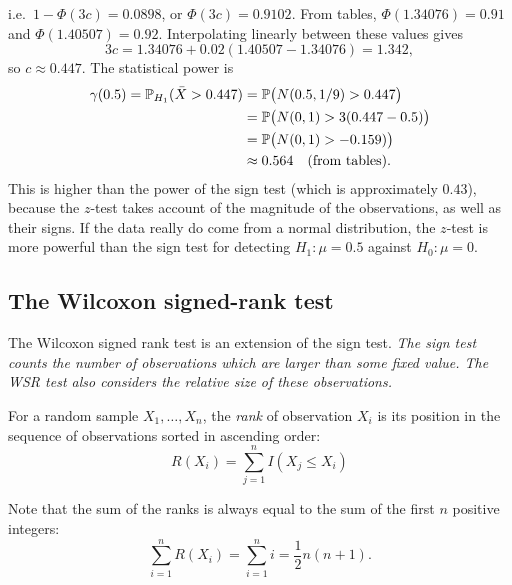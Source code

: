 \begin{exercise}
\begin{questions}
\begin{answer}
\[\]
i.e.\ $1-\Phi(3c) = 0.0898$, or $\Phi(3c) = 0.9102$. From tables, $\Phi(1.34076) = 0.91$ and $\Phi(1.40507)= 0.92$. Interpolating linearly between these values gives
\[
3c = 1.34076 + 0.02(1.40507 - 1.34076) = 1.342,
\]
so $c\approx 0.447$. The statistical power is 
\begin{align*}
\gamma(0.5) = \mathbb{P}_{H_1}(\bar{X} > 0.447) 
	& = \mathbb{P}\big(N(0.5,1/9) > 0.447\big) \\
	& = \mathbb{P}\big(N(0,1) > 3(0.447 - 0.5)\big) \\
	& = \mathbb{P}\big(N(0,1) > -0.159)\big) \\
	& \approx 0.564 \quad\text{(from tables).}
\end{align*}
This is higher than the power of the sign test (which is approximately $0.43$), because the $z$-test takes account of the magnitude of the observations, as well as their signs. If the data really do come from a normal distribution, the $z$-test is more powerful than the sign test for detecting $H_1:\mu=0.5$ against $H_0:\mu=0$.
\een
\end{answer}
\end{questions}
\end{exercise}


\subsection{The Wilcoxon signed-rank test}\label{sec:wsr_test}

The Wilcoxon signed rank test is an extension of the sign test.
\bit
\it The sign test counts the \emph{number} of observations which are larger than some fixed value.
\it The WSR test also considers the \emph{relative size} of these observations.
\eit


\begin{definition}
For a random sample $X_1,\ldots,X_n$, the \emph{rank} of observation $X_i$ is its position in the sequence of observations sorted in ascending order:
\[
R(X_i) = \sum_{j=1}^n I(X_j \leq X_i)
\]
\end{definition}

Note that the sum of the ranks is always equal to the sum of the first $n$ positive integers:
\[
\displaystyle \sum_{i=1}^n R(X_i) = \sum_{i=1}^n i = \frac{1}{2}n(n+1).
\]

